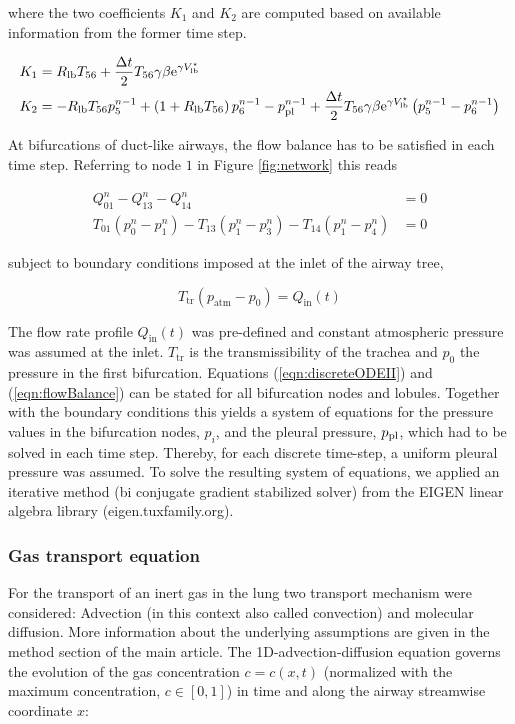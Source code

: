 where the two coefficients $K_1$ and $K_2$ are computed based on available information from the former time step.

\begin{align}
  K_1 &= R_{\mathrm{lb}} T_{56} + \frac{\Delta t}{2}T_{56}\gamma\beta\mathrm{e}^{\gamma V_{\mathrm{lb}}^\star} \\
  K_2 &= -R_{\mathrm{lb}} T_{56} p_5^{n-1} + \left( 1 + R_{\mathrm{lb}} T_{56}\right) p_6^{n-1} - p_{\mathrm{pl}}^{n-1} + \frac{\Delta t}{2}T_{56}\gamma\beta\mathrm{e}^{\gamma V_{\mathrm{lb}}^\star}\left( p_5^{n-1} - p_6^{n-1}\right)
\end{align}

At bifurcations of duct-like airways, the flow balance has to be satisfied in each time step.
Referring to node $1$ in Figure \ref{fig:network} this reads

\begin{equation} \label{eqn:flowBalance}
\begin{split}
Q_{01}^n - Q_{13}^n - Q_{14}^n &= 0 \\
T_{01}(p_0^n - p_1^n) - T_{13}(p_1^n - p_3^n) - T_{14}(p_1^n - p_4^n) &= 0
\end{split}
\end{equation}

subject to boundary conditions imposed at the inlet of the airway tree,

\begin{equation}
T_\mathrm{tr}(p_\mathrm{atm} - p_0) = Q_\mathrm{in}(t)
\end{equation}

The flow rate profile $Q_\mathrm{in}(t)$ was pre-defined and constant atmospheric pressure was assumed at the inlet.
$T_\mathrm{tr}$ is the transmissibility of the trachea and $p_0$ the pressure in the first bifurcation.
Equations (\ref{eqn:discreteODEII}) and (\ref{eqn:flowBalance}) can be stated for all bifurcation nodes and lobules.
Together with the boundary conditions this yields a system of equations for the pressure values in the bifurcation nodes, $p_i$, and the pleural pressure, $p_{\mathrm{pl}}$, which had to be solved in each time step.
Thereby, for each discrete time-step, a uniform pleural pressure was assumed.
To solve the resulting system of equations, we applied an iterative method (bi conjugate gradient stabilized solver) from the EIGEN linear algebra library (eigen.tuxfamily.org).


\subsubsection{Gas transport equation} \label{ssec:gas}
For the transport of an inert gas in the lung two transport mechanism were considered: Advection (in this context also called convection) and molecular diffusion.
More information about the underlying assumptions are given in the method section of the main article.
The 1D-advection-diffusion equation governs the evolution of the gas concentration $c = c(x,t)$ (normalized with the maximum concentration, $c\in[0,1]$) in time and along the airway streamwise coordinate $x$:

